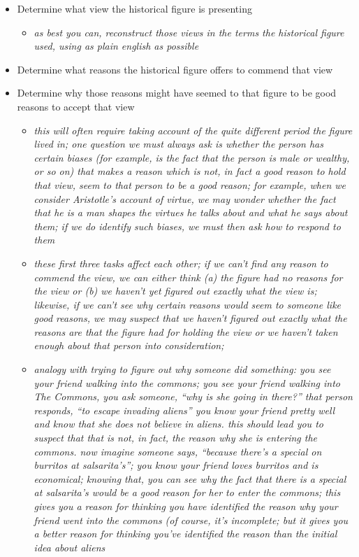 \documentclass[11pt]{article}
\begin{document}
\begin{itemize}
\item{Determine what view the historical figure is presenting}\begin{itemize}\item{\emph{as best you can, reconstruct those views in the terms the historical figure used, using as plain english as possible}}\end{itemize}
\item{Determine what reasons the historical figure offers to commend that view}
\item{Determine why those reasons might have seemed to that figure to be good reasons to accept that view}\begin{itemize}\item{\emph{this will often require taking account of the quite different period the figure lived in; one question we must always ask is whether the person has certain biases (for example, is the fact that the person is male or wealthy, or so on) that makes a reason which is not, in fact a good reason to hold that view, \emph{seem} to that person to be a good reason; for example, when we consider Aristotle's account of virtue, we may wonder whether the fact that he is a man shapes the virtues he talks about and what he says about them; if we do identify such biases, we must then ask how to respond to them}}
\item{\emph{these first three tasks affect each other; if we can't find any reason to commend the view, we can either think (a) the figure had no reasons for the view or (b) we haven't yet figured out exactly what the view is; likewise, if we can't see why certain reasons would seem to someone like good reasons, we may suspect that we haven't figured out exactly what the reasons are that the figure had for holding the view or we haven't taken enough about that person into consideration;}}\item{\emph{analogy with trying to figure out why someone did something: you see your friend walking into the commons; you see your friend walking into The Commons, you ask someone, ``why is she going in there?'' that person responds, ``to escape invading aliens'' you know your friend pretty well and know that she does not believe in aliens. this should lead you to suspect that that is not, in fact, the reason why she is entering the commons. now imagine someone says, ``because there's a special on burritos at salsarita's''; you know your friend loves burritos and is economical; knowing that, you can see why the fact that there is a special at salsarita's would be a good reason for her to enter the commons; this gives you a reason for thinking you have identified the reason why your friend went into the commons (of course, it's incomplete; but it gives you a better reason for thinking you've identified the reason than the initial idea about aliens}}\end{itemize}

\end{itemize}
\end{document}
